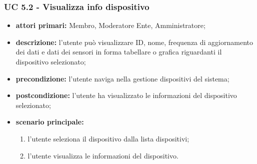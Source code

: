 			\subsubsection{UC 5.2 - Visualizza info dispositivo}
			\begin{itemize}
				\item \textbf{attori primari:} Membro, Moderatore Ente, Amministratore;
				\item \textbf{descrizione:} l'utente può visualizzare ID, nome, frequenza di aggiornamento dei dati e dati dei sensori in forma tabellare o grafica riguardanti il dispositivo selezionato;
				\item \textbf{precondizione:} l'utente naviga nella gestione dispositivi del sistema;
				\item \textbf{postcondizione:} l'utente ha visualizzato le informazioni del dispositivo selezionato;
				\item \textbf{scenario principale:}
				\begin{enumerate}
					\item{l'utente seleziona il dispositivo dalla lista dispositivi;}
					\item{l'utente visualizza le informazioni del dispositivo.}
				\end{enumerate}
			\end{itemize}
			
